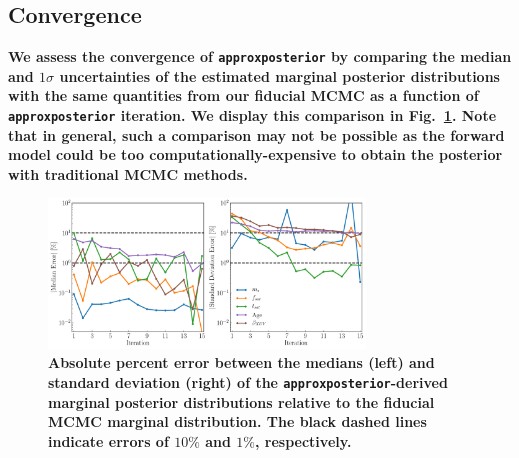 \documentclass[twocolumn]{aastex62}
\newcommand{\xxx}[1]{{\textbf{#1}}}
\newcommand{\approxposterior}[0]{\texttt{approxposterior}\xspace}
\begin{document}

\subsection{Convergence} \label{sec:app:convergence}

\xxx{We assess the convergence of \approxposterior by comparing the median and $1\sigma$ uncertainties of the estimated marginal posterior distributions with the same quantities from our fiducial MCMC as a function of \approxposterior iteration. We display this comparison in Fig.~\ref{fig:convergence}. Note that in general, such a comparison may not be possible as the forward model could be too computationally-expensive to obtain the posterior with traditional MCMC methods.}
\begin{figure}[h]
\centering
	\includegraphics[width=0.75\textwidth]{../Analysis/Convergence/convergence.pdf}
   \caption{\xxx{Absolute percent error between the medians (left) and standard deviation (right) of the \approxposterior-derived marginal posterior distributions relative to the fiducial MCMC marginal distribution. The black dashed lines indicate errors of $10\%$ and $1\%$, respectively.}}%
    \label{fig:convergence}%
\end{figure}
\end{document}

